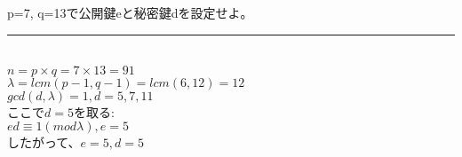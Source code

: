 \documentclass[twocolumn]{article}
\begin{document}
\subsection{}
\begin{spacing}{1.5}

p=7, q=13で公開鍵eと秘密鍵dを設定せよ。\\
\hrule
~\\
$n=p\times q=7\times 13=91$\\
$\lambda=lcm(p-1,q-1)=lcm(6,12)=12$\\
$gcd(d,\lambda)=1, d=5,7,11$\\
ここで$d=5$を取る:\\
$ed\equiv 1(mod\lambda), e=5$\\
したがって、$e=5, d=5$\\

\subsection{}


\end{spacing}
\end{document}
